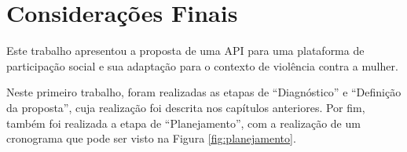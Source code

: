 \chapter{Considerações Finais} \label{cap:consideracoes_finais}

Este trabalho apresentou a proposta de uma API para uma plataforma de
participação social e sua adaptação para o contexto de violência contra a mulher.

% 

Neste primeiro trabalho, foram realizadas as etapas de ``Diagnóstico'' e ``Definição da proposta'', cuja realização foi descrita nos capítulos anteriores. 
Por fim, também foi realizada a etapa de ``Planejamento'', com a realização de um cronograma que pode ser visto na Figura \ref{fig:planejamento}.


